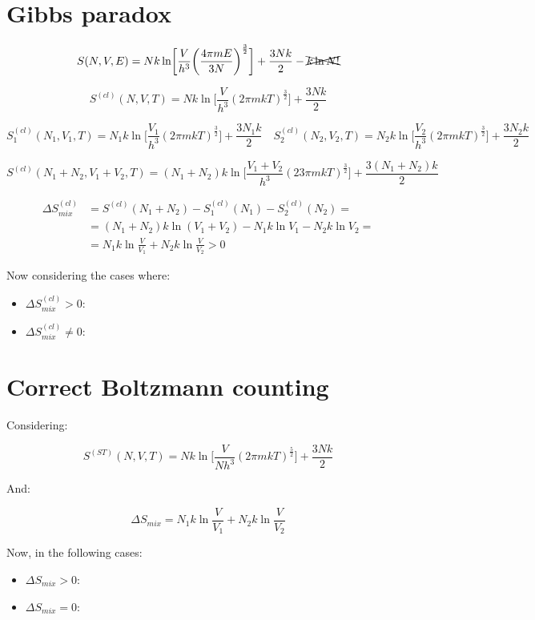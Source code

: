 \section{Gibbs paradox}

$$S(N, V, E) = Nk\ln\biggl[\frac{V}{h^3}\biggl(\frac{4\pi m E}{3N}\biggr)^{\frac{3}{2}}\biggr] + \frac{3Nk}{2} - \xcancel{k\ln N!}$$

$$S^{(cl)}(N, V, T) = Nk\ln\biggl[\frac{V}{h^3}(2\pi m k T)^{\frac{3}{2}}\biggr] + \frac{3Nk}{2}$$

$$S_1^{(cl)}(N_1, V_1, T) = N_1k\ln\biggl[\frac{V_1}{h^3}(2\pi m k T)^{\frac{3}{2}}\biggr] + \frac{3N_1k}{2} \quad S_2^{(cl)}(N_2, V_2, T) = N_2k\ln\biggl[\frac{V_2}{h^3}(2\pi m k T)^{\frac{3}{2}}\biggr] + \frac{3N_2k}{2}$$

$$S^{(cl)}(N_1 + N_2, V_1+V_2, T) = (N_1 + N_2)k\ln\biggl[\frac{V_1+V_2}{h^3}(23\pi m k T)^{\frac{3}{2}}\biggr] + \frac{3(N_1+N_2)k}{2}$$

\begin{align*}
	\Delta S_{mix}^{(cl)} &= S^{(cl)}(N_1 + N_2) - S_1^{(cl)}(N_1) - S_2^{(cl)}(N_2) =\\
												&= (N_1 + N_2)k\ln(V_1+V_2) - N_1k\ln V_1- N_2k\ln V_2 = \\
												&= N_1 k\ln\frac{V}{V_1} + N_2k\ln\frac{V}{V_2}>0
\end{align*}

Now considering the cases where:

\begin{multicols}{2}
	\begin{itemize}
		\item $\Delta S_{mix}^{(cl)} > 0$:
		\item $\Delta S_{mix}^{(cl)} \neq 0$:
	\end{itemize}
\end{multicols}

\section{Correct Boltzmann counting}
Considering:

$$S^{(ST)}(N, V, T) = Nk\ln\biggl[\frac{V}{Nh^3}(2\pi mkT)^{\frac{5}{2}}\biggr] + \frac{3Nk}{2}$$

And:

$$\Delta S_{mix} = N_1k\ln\frac{V}{V_1}+N_2k\ln\frac{V}{V_2}$$

Now, in the following cases:

\begin{multicols}{2}
	\begin{itemize}
		\item $\Delta S_{mix} > 0$:
		\item $\Delta S_{mix} = 0$:
	\end{itemize}
\end{multicols}
